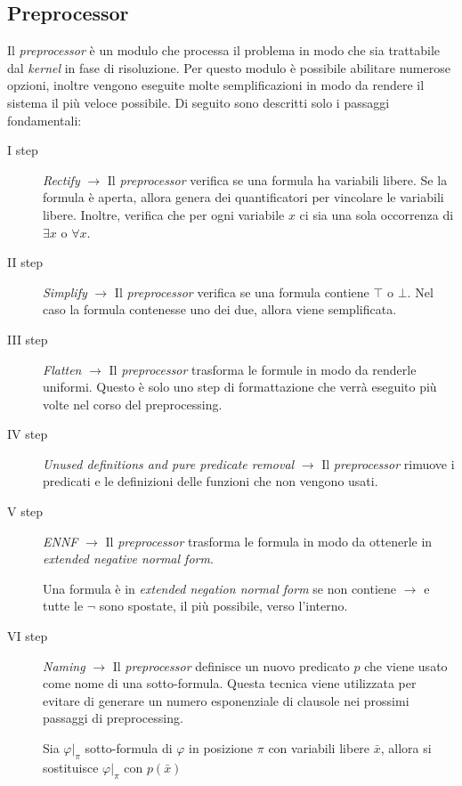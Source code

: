 \subsection{Preprocessor}
Il \emph{\emph{preprocessor}} è un modulo che processa il problema in modo che sia trattabile dal \emph{kernel} in fase di risoluzione.
Per questo modulo è possibile abilitare numerose opzioni, inoltre vengono eseguite molte semplificazioni in modo da rendere il sistema il 
più veloce possibile. Di seguito sono descritti solo i passaggi fondamentali: 
\begin{description}
    \item[I step] \emph{Rectify} $\longrightarrow$ Il \emph{preprocessor} verifica se una formula ha variabili libere. Se la formula è aperta, 
    allora genera dei quantificatori per vincolare le variabili libere. Inoltre, verifica che per ogni variabile $x$ ci sia una sola occorrenza di $\exists x$ o $\forall x$. 
    \item[II step] \emph{Simplify} $\longrightarrow$ Il \emph{preprocessor} verifica se una formula contiene $\top$ o $\bot$. Nel caso la formula contenesse uno dei due, allora
    viene semplificata.
    \item[III step] \emph{Flatten} $\longrightarrow$ Il \emph{preprocessor} trasforma le formule in modo da renderle uniformi. Questo è solo uno step di formattazione che verrà eseguito più volte nel corso del preprocessing.
    \item[IV step] \emph{Unused definitions and pure predicate removal} $\longrightarrow$ Il \emph{preprocessor} rimuove i predicati e le definizioni delle funzioni che non vengono usati.
    \item[V step] \emph{ENNF} $\longrightarrow$ Il \emph{preprocessor} trasforma le formula in modo da ottenerle in \emph{extended negative normal form}.
    \begin{definition}
        Una formula è in \emph{extended negation normal form} se non contiene $\rightarrow$ e tutte le $\neg$ sono spostate, il più possibile, verso l'interno.  
    \end{definition}
    \item[VI step] \emph{Naming} $\longrightarrow$ Il \emph{preprocessor} definisce un nuovo predicato $p$ che viene usato come nome di una sotto-formula. 
    Questa tecnica viene utilizzata per evitare di generare un numero esponenziale di clausole nei prossimi passaggi di preprocessing.
    \begin{definition}
        Sia $\varphi|_\pi$ sotto-formula di $\varphi$ in posizione $\pi$ con variabili libere $\bar{x}$, allora si sostituisce $\varphi|_\pi$ con $p(\bar{x})$

\end{definition}
\end{description}
